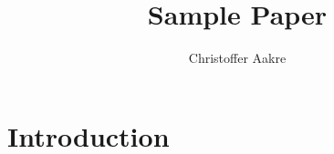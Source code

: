\documentclass{templates/paper}
\title{Sample Paper}
\author{Christoffer Aakre}
\begin{document}
\maketitle

\section{Introduction}
\cite{inverse-square}

\printbibliography
\end{document}
